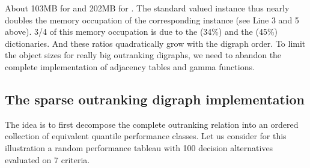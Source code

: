 \documentclass[a4paper,12pt,english]{sphinxhowto}
\begin{document}
\begin{sphinxVerbatim}[commandchars=\\\{\},numbers=left,firstnumber=1,stepnumber=1]
   
\end{sphinxVerbatim}

About 103MB for  and 202MB for . The standard  valued  instance  thus nearly doubles the memory occupation of the corresponding   instance (see Line 3 and 5 above). 3/4 of this memory occupation is due to the  (34\%) and the  (45\%) dictionaries. And these ratios quadratically grow with the digraph order. To limit the object sizes for really big outranking digraphs, we need to abandon the complete implementation of adjacency tables and gamma functions.


\subsection{The sparse outranking digraph implementation}
\label{\detokenize{tutorial:the-sparse-outranking-digraph-implementation}}
The idea is to first decompose the complete outranking relation into an ordered collection of equivalent quantile performance classes. Let us consider for this illustration a random performance tableau with 100 decision alternatives evaluated on 7 criteria.

\begin{sphinxVerbatim}[commandchars=\\\{\},numbers=left,firstnumber=1,stepnumber=1]
   
  
                              
\end{sphinxVerbatim}
\end{document}
